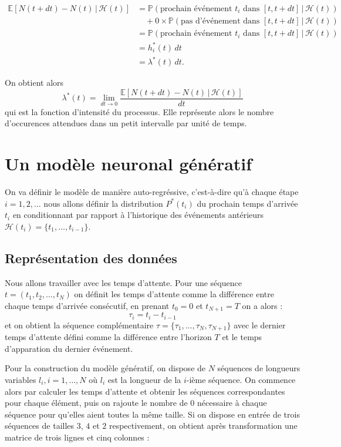 \documentclass{article}
\theoremstyle{definition}
\theoremstyle{remark}
\begin{document}
\begin{align*}
\mathbb{E}\left[N(t + dt) - N(t)\, |\, \mathcal{H}(t)\right]
& = \mathbb{P}(\text{prochain événement } t_i \text{ dans }
[t, t + dt] \, |\,  \mathcal{H}(t)) \\
& \quad + 0 \times \mathbb{P}(\text{pas d'événement dans }
[t, t + dt] \, |\,  \mathcal{H}(t)) \\
& = \mathbb{P}(\text{prochain événement } t_i \text{ dans }
[t, t + dt] \, |\,  \mathcal{H}(t)) \\
& = h^*_i(t)\, dt \\
& = \lambda^*(t)\, dt.
\end{align*}

On obtient alors
$$ \lambda^*(t) = \lim_{dt \to 0}
\frac{\mathbb{E}\left[N(t + dt) - N(t)\, |\, \mathcal{H}(t)\right]}{dt}$$
qui est la fonction d'intensité du processus. Elle représente alors
le nombre d'occurences attendues dans un petit intervalle par unité de temps.

\section{Un modèle neuronal génératif}

On va définir le modèle de manière auto-regréssive, c'est-à-dire qu'à chaque
étape $i = 1, 2, \dots$ nous allons définir la distribution
$P^*(t_i)$ du prochain temps d'arrivée $t_i$ en conditionnant par rapport
à l'historique des événements antérieurs $\mathcal{H}(t_i)
= \{t_1, \dots, t_{i-1}\}$.

\subsection{Représentation des données}

Nous allons travailler avec les temps d'attente. Pour une séquence
$t = (t_1, t_2, \dots, t_N)$ on définit les temps d'attente comme la
différence entre chaque temps d'arrivée consécutif, en prenant $t_0 = 0$
et $t_{N+1} = T$ on a alors :
$$\tau_i = t_i- t_{i-1}$$ et on obtient la séquence complémentaire
$\tau = \{\tau_1, \dots, \tau_N, \tau_{N+1}\}$ avec le dernier temps d'attente
défini comme la différence entre l'horizon $T$ et le temps d'apparation du
dernier événement.

Pour la construction du modèle génératif, on dispose de $N$ séquences
de longueurs variables $l_i, i = 1, \dots, N$ où $l_i$ est la longueur
de la $i$-ième séquence. On commence alors par calculer les temps d'attente
et obtenir les séquences correspondantes pour chaque élément, puis on rajoute
le nombre de $0$ nécessaire à chaque séquence pour qu'elles aient toutes la
même taille. Si on dispose en entrée de trois séquences de tailles $3$, $4$ et
$2$ respectivement, on obtient après transformation une matrice de
trois lignes et cinq colonnes :
\end{document}
